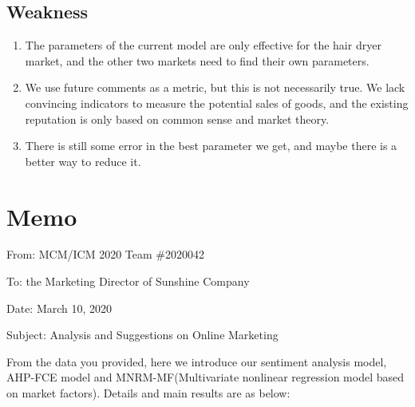\documentclass{mcmthesis}
\begin{document}
  \subsection{Weakness} 
  \begin{enumerate}
  \item The parameters of the current model are only effective for the hair dryer market, and the other two markets need to find their own parameters.
  \item We use future comments as a metric, but this is not necessarily true. We lack convincing indicators to measure the potential sales of goods, and the existing reputation is only based on common sense and market theory.
  \item There is still some error in the best parameter we get, and maybe there is a better way to reduce it.
  \end{enumerate}




\newpage
\section{Memo}

\noindent From: MCM/ICM 2020 Team $\#$2020042

\noindent To: the Marketing Director of Sunshine Company

\noindent Date: March 10, 2020

\noindent Subject: Analysis and Suggestions on Online Marketing

From the data you provided, here we introduce our sentiment analysis model, AHP-FCE model and MNRM-MF(Multivariate nonlinear regression model based on market factors). Details and main results are as below:
\end{document}
